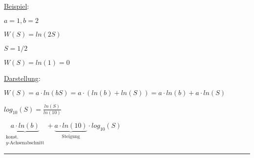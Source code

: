 \documentclass[18pt,a4paper]{scrreprt}
\begin{document}
\uline{Beispiel}:

$a =1, b=2$

$W(S) = ln(2S)$

$S = 1/2$

$W(S) = ln(1) = 0$

\uline{Darstellung}:

$W(S) = a\cdot ln(bS) = a\cdot (ln(b) + ln(S)) = a\cdot ln(b) + a\cdot ln(S)$

$log_{10}(S) = \frac{ln(S)}{ln(10)}$

$\underbrace{a\cdot ln(b)}_{\substack{\text{konst.}\\y\text{-Achsenabschnitt}}} + \underbrace{a\cdot ln(10)}_{\text{Steigung}} \cdot log_{10}(S)$

\rule{\textwidth}{0.4mm}\\
\end{document}
